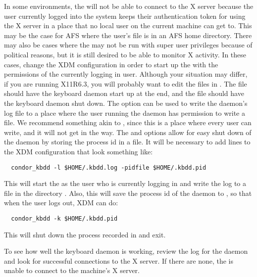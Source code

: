 In some environments, the   will not be able to connect to the X
server because the user currently logged into the system keeps their
authentication token for using the X server in a place that no local user on
the current machine can get to.  
This may be the case for AFS where
the user's  file is in an AFS home directory.
There may also
be cases where the   may not be run with super user privileges
because of political reasons,
but it is still desired to be able to monitor X activity.
In these cases, change the XDM configuration in order to
start up the  with the permissions of the currently logging in
user.  Although your situation may differ, if you are running X11R6.3, you
will probably want to edit the files in .
The 
file should have the keyboard daemon start up at the end,
and the  file
should have the keyboard daemon shut down.  
The  option can be used to write the daemon's log file to a
place where the user running the daemon has permission to write a file.  We
recommend something akin to ,
since this is a place where every
user can write, and it will not get in the way.
The  and 
options allow
for easy shut down of the daemon by storing the process id in a file.  
It will be necessary
to add lines to the XDM configuration that look something like:

\footnotesize
\begin{verbatim}
  condor_kbdd -l $HOME/.kbdd.log -pidfile $HOME/.kbdd.pid
\end{verbatim}
\normalsize

This will start the  as the user who is currently logging in
and write the log to a file in the directory 
.  Also, this
will save the process id of the daemon to , so that when the user
logs out, XDM can do:

\footnotesize
\begin{verbatim}
  condor_kbdd -k $HOME/.kbdd.pid
\end{verbatim}
\normalsize

This will shut down the process recorded in  and exit.

To see how well the keyboard daemon is working, review
the log for the daemon and look for successful connections to the X
server.  If there are none, the 
is unable to connect to the machine's X server.

